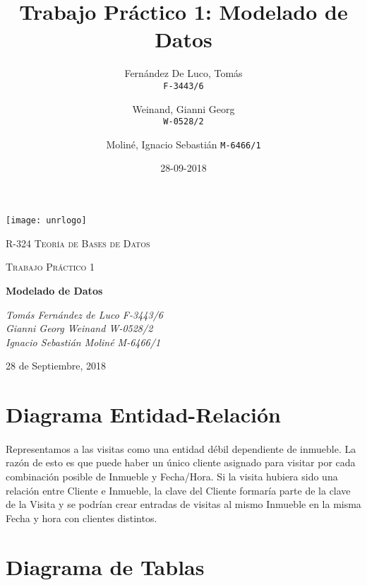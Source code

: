 \documentclass{article}
\title{Trabajo Pr\'actico 1: Modelado de Datos}
\date{28-09-2018}
\author{
	Fern\'andez De Luco, Tom\'as\\
	\texttt{F-3443/6}
	\and
	Weinand, Gianni Georg\\
	\texttt{W-0528/2}
	\and
	Molin\'e, Ignacio Sebasti\'an
	\texttt{M-6466/1}
}
\begin{document}
\begin{titlepage}
	\centering
	\texttt{[image: unrlogo]}\par\vspace{1cm}
	{\scshape\LARGE R-324 Teor\'ia de Bases de Datos \par}
	\vspace{1cm}
	{\scshape\Large Trabajo Pr\'actico 1\par}
	\vspace{1.5cm}
	{\huge\bfseries Modelado de Datos \par}
	\vspace{2cm}
	{\Large\itshape Tom\'as Fern\'andez de Luco F-3443/6 \\ Gianni Georg Weinand W-0528/2 \\ Ignacio Sebasti\'an Molin\'e M-6466/1 \par}

	\vfill

	{\large 28 de Septiembre, 2018 \par}
\end{titlepage}

\begin{comment}
\tableofcontents

\newpage
\end{comment}

\section{Diagrama Entidad-Relaci\'on}

\paragraph{}
Representamos a las visitas como una entidad d\'ebil dependiente de inmueble. La raz\'on de esto es que puede haber un \'unico cliente asignado para visitar por cada combinaci\'on posible de Inmueble y Fecha/Hora. Si la visita hubiera sido una relaci\'on entre Cliente e Inmueble, la clave del Cliente formar\'ia parte de la clave de la Visita y se podr\'ian crear entradas de visitas al mismo Inmueble en la misma Fecha y hora con clientes distintos.


\section{Diagrama de Tablas}
\end{document}
